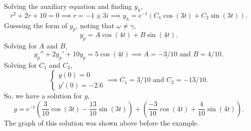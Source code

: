 \noindent
Solving the auxiliary equation and finding $y_h$,
\begin{equation*}
	r^2 + 2r + 10 = 0 \implies r = -1 \pm 3i \implies y_h = e^{-t}\left(C_1\cos{(3t) + C_2\sin{(3t)}}\right).
\end{equation*}
Guessing the form of $y_p$, noting that $\omega \neq \gamma$,
\begin{equation*}
	y_p = A\cos{(4t)} + B\sin{(4t)}.
\end{equation*}
Solving for $A$ and $B$,
\begin{equation*}
	y_p'' + 2y_p' + 10y_p = 5\cos{(4t)} \implies A = -3/10 \text{ and } B = 4/10.
\end{equation*}
Solving for $C_1$ and $C_2$,
\begin{equation*}
	\begin{cases}
		y(0) = 0 \\
		y'(0) = -2.6
	\end{cases} \implies C_1 = 3/10 \text{ and } C_2 = -13/10.
\end{equation*}
So, we have a solution for $y$,
\begin{equation*}
	y = e^{-t}\left(\frac{3}{10}\cos{(3t)} - \frac{13}{10}\sin{(3t)}\right) + \left(\frac{-3}{10}\cos{(4t)} + \frac{4}{10}\sin{(4t)}\right).
\end{equation*}
The graph of this solution was shown above before the example.